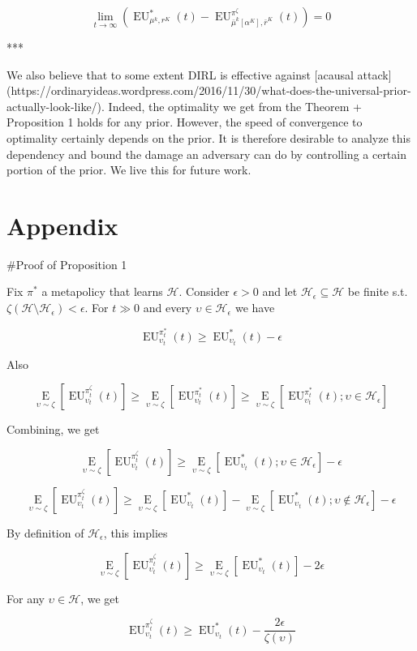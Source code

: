 \documentclass[a4paper]{article}
\newcommand{\E}[1]{\underset{#1}{\operatorname{E}}}
\newcommand{\Hy}{\mathcal{H}}
\newcommand{\EU}{\operatorname{EU}}
\begin{document}
$$\lim_{t \rightarrow \infty} (\EU_{\mu^k,r^K}^*(t) - \EU_{\bar{\mu}^k[\alpha^K],\bar{r}^K}^{\pi^\zeta}(t)) = 0$$

***

We also believe that to some extent DIRL is effective against [acausal attack](https://ordinaryideas.wordpress.com/2016/11/30/what-does-the-universal-prior-actually-look-like/). Indeed, the optimality we get from the Theorem + Proposition 1 holds for any prior. However, the speed of convergence to optimality certainly depends on the prior.  It is therefore desirable to analyze this dependency and bound the damage an adversary can do by controlling a certain portion of the prior. We live this for future work.

\section{Appendix}

\#Proof of Proposition 1

Fix $\pi^*$ a metapolicy that learns $\Hy$. Consider $\epsilon > 0$ and let $\Hy_\epsilon \subseteq \Hy$ be finite s.t. $\zeta(\Hy \setminus \Hy_\epsilon) < \epsilon$. For $t \gg 0$ and every $\upsilon \in \Hy_\epsilon$ we have

$$\EU_{\upsilon_t}^{\pi^*_t}(t) \geq \EU_{\upsilon_t}^{*}(t) - \epsilon$$

Also

$$\E{\upsilon \sim \zeta}[\EU_{\upsilon_t}^{\pi^\zeta_t}(t)] \geq \E{\upsilon \sim \zeta}[\EU_{\upsilon_t}^{\pi^*_t}(t)] \geq \E{\upsilon \sim \zeta}[\EU_{\upsilon_t}^{\pi^*_t}(t); \upsilon \in \Hy_\epsilon]$$

Combining, we get

$$\E{\upsilon \sim \zeta}[\EU_{\upsilon_t}^{\pi^\zeta_t}(t)] \geq \E{\upsilon \sim \zeta}[\EU_{\upsilon_t}^{*}(t); \upsilon \in \Hy_\epsilon] - \epsilon$$

$$\E{\upsilon \sim \zeta}[\EU_{\upsilon_t}^{\pi^\zeta_t}(t)] \geq \E{\upsilon \sim \zeta}[\EU_{\upsilon_t}^{*}(t)] -  \E{\upsilon \sim \zeta}[\EU_{\upsilon_t}^{*}(t); \upsilon \not\in \Hy_\epsilon] - \epsilon$$

By definition of $\Hy_\epsilon$, this implies

$$\E{\upsilon \sim \zeta}[\EU_{\upsilon_t}^{\pi^\zeta_t}(t)] \geq \E{\upsilon \sim \zeta}[ \EU_{\upsilon_t}^{*}(t)] -  2\epsilon$$

For any $\upsilon \in \Hy$, we get

$$\EU_{\upsilon_t}^{\pi^\zeta_t}(t) \geq \EU_{\upsilon_t}^{*}(t) - \frac{2\epsilon}{\zeta(\upsilon)}$$
\end{document}
